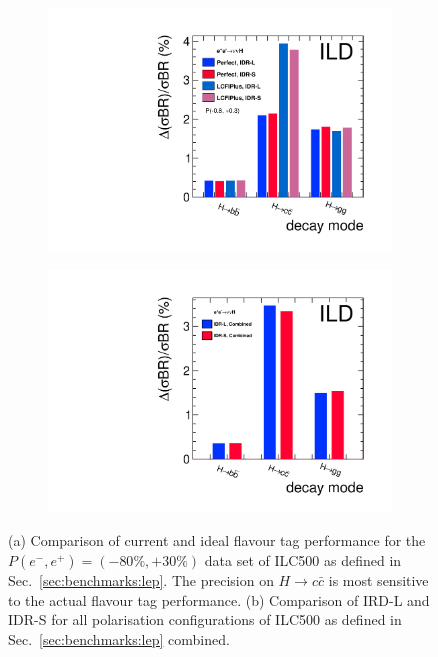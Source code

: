 \begin{figure}[htbp]
\begin{subfigure}{0.49\hsize} 
 \includegraphics[width=\textwidth]{Performance/fig/IDRplot1.pdf}
 \caption{ \label{fig:Hbbccgg:BR:cheat}}
 \end{subfigure}
\begin{subfigure}{0.49\hsize} 
 \includegraphics[width=\textwidth]{Performance/fig/IDRplot3.pdf}
 \caption{  \label{fig:Hbbccgg:BR:LS}}
 \end{subfigure}
\caption{
(a) Comparison of current and ideal flavour tag performance for the $P(e^-,e^+)=(-80\%,+30\%)$ data set of ILC500 as defined in Sec.~\ref{sec:benchmarks:lep}. The precision on $H \to c\bar{c}$ is most sensitive to the actual flavour tag performance.
(b) Comparison of IRD-L and IDR-S for all polarisation configurations of ILC500 as defined in Sec.~\ref{sec:benchmarks:lep} combined.
}
\label{fig:Hbbccgg:BR}
\end{figure}

